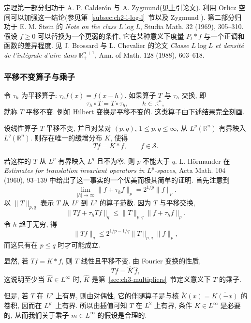 定理第一部分归功于 A. P. Calderón 与 A. Zygmund(见上引论文). 利用 Orlicz 空间可以加强这一结论(参见第~\ref{subsec:ch2-l-log-l}~节以及 Zygmund ). 第二部分归功于 E. M. Stein 的 \emph{Note on the class $L\log L$}, Studia Math. 32 (1969), 305--310. 假设 $f\ge0$ 可以替换为一个更弱的条件, 它在某种意义下度量 $P_t*f$ 与一个正调和函数的差异程度. 见 J. Brossard 与 L. Chevalier 的论文 \emph{Classe $L\log L$ et densité de l'intégrale d'aire dans $\mathbb R_+^{n+1}$}, Ann. of Math. 128 (1988), 603--618.

\subsubsection{平移不变算子与乘子}
\label{subsec:ch3-translation-invariant-operators}

令 $\tau_h$ 为平移算子: $\tau_hf(x)=f(x-h)$. 如果算子 $T$ 与 $\tau_h$ 交换, 即
\[
 \tau_h\circ T=T\circ\tau_h,
 \qquad h\in\mathbb R^n,
\]
就称 $T$ 平移不变. 例如 Hilbert 变换是平移不变的. 这类算子由下述结果完全刻画.

\begin{Theorem}
\label{thm:ch3-translation-invariant-convolution}
设线性算子 $T$ 平移不变, 并且对某对 $(p,q)$, $1\le p,q\le\infty$, 从 $L^p(\mathbb R^n)$ 有界映入 $L^q(\mathbb R^n)$. 则存在唯一的缓增分布 $K$, 使得
\[
 Tf=K*f,
 \qquad f\in\mathcal S.
\]
\end{Theorem}

若这样的 $T$ 从 $L^p$ 有界映入 $L^q$ 且不为零, 则 $p$ 不能大于 $q$. L. Hörmander 在 \emph{Estimates for translation invariant operators in $L^p$-spaces}, Acta Math. 104 (1960), 93--139 中给出了这一事实的一个优美而极其简单的证明. 首先注意到
\[
 \lim_{|h|\to\infty}\|f+\tau_hf\|_p=2^{1/p}\|f\|_p.
\]
以 $\|T\|_{p,q}$ 表示 $T$ 从 $L^p$ 到 $L^q$ 的算子范数. 因为 $T$ 与平移交换,
\[
 \|Tf+\tau_hTf\|_q\le\|T\|_{p,q}\|f+\tau_hf\|_p.
\]
令 $h$ 趋于无穷, 得
\[
 \|Tf\|_q\le2^{1/p-1/q}\|T\|_{p,q}\|f\|_p,
\]
而这只有在 $p\le q$ 时才可能成立.

显然, 若 $Tf=K*f$, 则 $T$ 线性且平移不变. 由 Fourier 变换的性质,
\[
 \widehat{Tf}=\widehat K\,\widehat f,
\]
这说明至少当 $\widehat K\in L^\infty$ 时, $\widehat K$ 是第~\ref{sec:ch3-multipliers}~节定义意义下 $T$ 的乘子.

\hypertarget{chapter-03-page-079}{}
但是, 若 $T$ 在 $L^p$ 上有界, 则由对偶性, 它的伴随算子是与核 $\widetilde K(x)=\overline{K(-x)}$ 的卷积, 因而在 $L^{p'}$ 上有界. 所以由插值可知 $T$ 在 $L^2$ 上有界, 条件 $\widehat K\in L^\infty$ 是必要的, 从而我们关于乘子 $m\in L^\infty$ 的假设是合理的.

